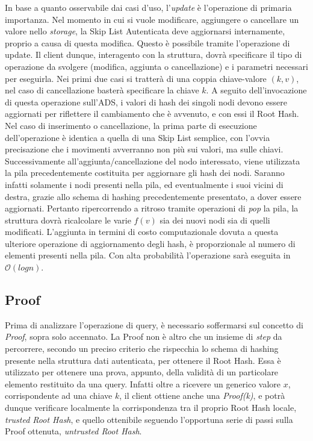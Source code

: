 		In base a quanto osservabile dai casi d'uso, l'\textit{update} è l'operazione di primaria importanza. Nel momento in cui si vuole modificare, aggiungere o cancellare un valore nello \textit{storage}, la Skip List Autenticata deve aggiornarsi internamente, proprio a causa di questa modifica. Questo è possibile tramite l'operazione di update. Il client dunque, interagento con la struttura, dovrà specificare il tipo di operazione da svolgere (modifica, aggiunta o cancellazione) e i parametri necessari per eseguirla. Nei primi due casi si tratterà di una coppia chiave-valore $ (k,v) $, nel caso di cancellazione basterà specificare la chiave $ k $.
		A seguito dell'invocazione di questa operazione sull'ADS, i valori di hash dei singoli nodi devono essere aggiornati per riflettere il cambiamento che è avvenuto, e con essi il Root Hash.
		Nel caso di inserimento o cancellazione, la prima parte di esecuzione dell'operazione è identica a quella di una Skip List semplice, con l'ovvia precisazione che i movimenti avverranno non più sui valori, ma sulle chiavi. Successivamente all'aggiunta/cancellazione del nodo interessato, viene utilizzata la pila precedentemente costituita per aggiornare gli hash dei nodi. Saranno infatti solamente i nodi presenti nella pila, ed eventualmente i suoi vicini di destra, grazie allo schema di hashing precedentemente presentato, a dover essere aggiornati. Pertanto ripercorrendo a ritroso tramite operazioni di \textit{pop} la pila, la struttura dovrà ricalcolare le varie $ f(v) $ sia dei nuovi nodi sia di quelli modificati.
		L'aggiunta in termini di costo computazionale dovuta a questa ulteriore operazione di aggiornamento degli hash, è proporzionale al numero di elementi presenti nella pila. Con alta probabilità l'operazione sarà eseguita in $\mathcal{O}(log{}n)$.
					
	\subsection{Proof}
		

		Prima di analizzare l'operazione di query, è necessario soffermarsi sul concetto di \textit{Proof}, sopra solo accennato. La Proof non è altro che un insieme di \textit{step} da percorrere, secondo un preciso criterio che rispecchia lo schema di hashing presente nella struttura dati autenticata, per ottenere il Root Hash. Essa è utilizzato per ottenere una prova, appunto, della validità di un particolare elemento restituito da una query. Infatti oltre a ricevere un generico valore $ x $, corrispondente ad una chiave $ k $, il client ottiene anche una \textit{Proof(k)}, e potrà dunque verificare localmente la corrispondenza tra il proprio Root Hash locale, \textit{trusted Root Hash}, e quello ottenibile seguendo l'opportuna serie di passi sulla Proof ottenuta, \textit{untrusted Root Hash}.
		
